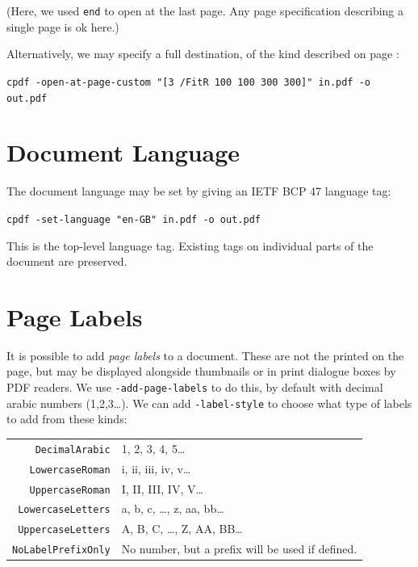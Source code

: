\documentclass{book}
\begin{document}
\noindent (Here, we used \texttt{end} to open at the last page. Any page specification describing a single page is ok here.)

Alternatively, we may specify a full destination, of the kind described on page \pageref{destinations}:
  \begin{framed}
    \noindent\small\verb!cpdf -open-at-page-custom "[3 /FitR 100 100 300 300]" in.pdf -o out.pdf!
  \end{framed}

\section{Document Language}

The document language may be set by giving an IETF BCP 47 language tag:
  \begin{framed}
    \noindent\small\verb!cpdf -set-language "en-GB" in.pdf -o out.pdf!
  \end{framed}

\noindent This is the top-level language tag. Existing tags on individual parts of the document are preserved.

\section{Page Labels}

It is possible to add \textit{page labels} to a document. These are not the printed on the page, but may be displayed alongside thumbnails or in print dialogue boxes by PDF readers. We use \texttt{-add-page-labels} to do this, by default with decimal arabic numbers (1,2,3\ldots). We can add \texttt{-label-style} to choose what type of labels to add from these kinds:

\vspace{4mm}
{\small\begin{tabular}{rl}
  \texttt{DecimalArabic} & 1, 2, 3, 4, 5\ldots \\
  \texttt{LowercaseRoman} & i, ii, iii, iv, v\ldots \\
  \texttt{UppercaseRoman} & I, II, III, IV, V\ldots \\
  \texttt{LowercaseLetters} & a, b, c, \ldots , z, aa, bb\ldots \\
  \texttt{UppercaseLetters} & A, B, C, \ldots , Z, AA, BB\ldots \\
  \texttt{NoLabelPrefixOnly} & No number, but a prefix will be used if defined.
\end{tabular}}
\vspace{4mm}
\end{document}
